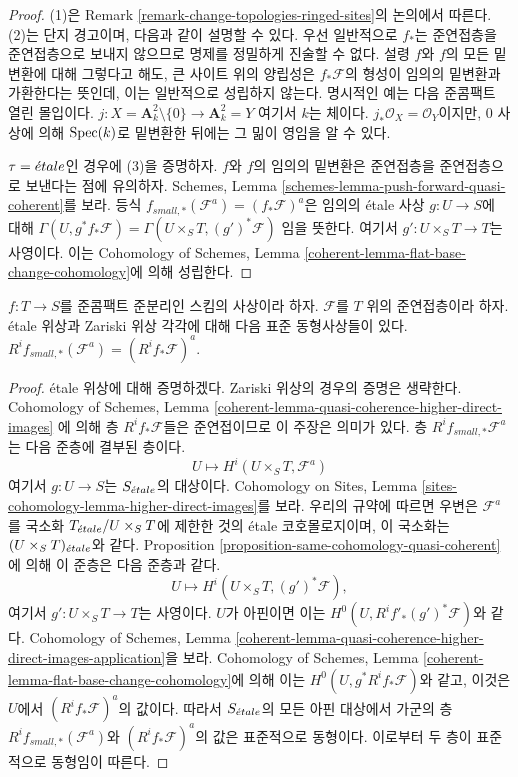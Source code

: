 \begin{proof}
(1)은 Remark \ref{remark-change-topologies-ringed-sites}의 논의에서 따른다.
(2)는 단지 경고이며, 다음과 같이 설명할 수 있다. 우선 일반적으로
$f_*$는 준연접층을 준연접층으로 보내지 않으므로 명제를 정밀하게
진술할 수 없다. 설령 $f$와 $f$의 모든 밑변환에 대해 그렇다고 해도,
큰 사이트 위의 양립성은 $f_*\mathcal{F}$의 형성이 임의의 밑변환과
가환한다는 뜻인데, 이는 일반적으로 성립하지 않는다. 명시적인 예는
다음 준콤팩트 열린 몰입이다.
$j : X = \mathbf{A}^2_k \setminus \{0\} \to \mathbf{A}^2_k = Y$
여기서 $k$는 체이다. $j_*\mathcal{O}_X = \mathcal{O}_Y$이지만,
$0$ 사상에 의해 $\mathop{\mathrm{Spec}}(k)$로 밑변환한 뒤에는 그 밂이 영임을 알 수 있다.

\medskip\noindent
$\tau = {\acute{e}tale}$인 경우에 (3)을 증명하자. $f$와 $f$의 임의의 밑변환은
준연접층을 준연접층으로 보낸다는 점에 유의하자. Schemes, Lemma
\ref{schemes-lemma-push-forward-quasi-coherent}를 보라.
등식 $f_{small, *}(\mathcal{F}^a) = (f_*\mathcal{F})^a$은 임의의
\'etale 사상 $g : U \to S$에 대해
$\Gamma(U, g^*f_*\mathcal{F}) = \Gamma(U \times_S T, (g')^*\mathcal{F})$
임을 뜻한다. 여기서 $g' : U \times_S T \to T$는 사영이다.
이는 Cohomology of Schemes, Lemma
\ref{coherent-lemma-flat-base-change-cohomology}에 의해 성립한다.
\end{proof}

\begin{lemma}
\label{lemma-higher-direct-images-small-etale}
$f : T \to S$를 준콤팩트 준분리인 스킴의 사상이라 하자.
$\mathcal{F}$를 $T$ 위의 준연접층이라 하자. \'etale 위상과
Zariski 위상 각각에 대해 다음 표준 동형사상들이 있다.
$R^if_{small, *}(\mathcal{F}^a) = (R^if_*\mathcal{F})^a$.
\end{lemma}

\begin{proof}
\'etale 위상에 대해 증명하겠다. Zariski 위상의 경우의 증명은 생략한다.
Cohomology of Schemes, Lemma
\ref{coherent-lemma-quasi-coherence-higher-direct-images}
에 의해 층 $R^if_*\mathcal{F}$들은 준연접이므로 이 주장은 의미가 있다.
층 $R^if_{small, *}\mathcal{F}^a$는 다음 준층에 결부된 층이다.
$$
U \longmapsto H^i(U \times_S T, \mathcal{F}^a)
$$
여기서 $g : U \to S$는 $S_{\acute{e}tale}$의 대상이다. Cohomology on Sites,
Lemma \ref{sites-cohomology-lemma-higher-direct-images}를 보라.
우리의 규약에 따르면 우변은 $\mathcal{F}^a$를 국소화
$T_{\acute{e}tale}/U \times_S T$에 제한한 것의 \'etale 코호몰로지이며,
이 국소화는 $(U \times_S T)_{\acute{e}tale}$와 같다. Proposition
\ref{proposition-same-cohomology-quasi-coherent}에 의해 이 준층은
다음 준층과 같다.
$$
U \longmapsto
H^i(U \times_S T, (g')^*\mathcal{F}),
$$
여기서 $g' : U \times_S T \to T$는 사영이다. $U$가 아핀이면 이는
$H^0(U, R^if'_*(g')^*\mathcal{F})$와 같다. Cohomology of Schemes,
Lemma \ref{coherent-lemma-quasi-coherence-higher-direct-images-application}을
보라. Cohomology of Schemes, Lemma
\ref{coherent-lemma-flat-base-change-cohomology}에 의해 이는
$H^0(U, g^*R^if_*\mathcal{F})$와 같고, 이것은 $U$에서
$(R^if_*\mathcal{F})^a$의 값이다. 따라서 $S_{\acute{e}tale}$의 모든 아핀 대상에서
가군의 층 $R^if_{small, *}(\mathcal{F}^a)$와
$(R^if_*\mathcal{F})^a$의 값은 표준적으로 동형이다. 이로부터 두 층이
표준적으로 동형임이 따른다.
\end{proof}




